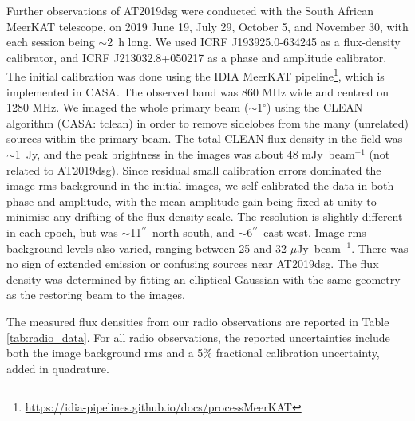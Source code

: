 \documentclass{nature_plusfigure}
\newcommand{\arcdeg}{\mbox{$^\circ$}}
\newcommand{\arcsec}{$^{\prime\prime}$}
\begin{document}
\begin{methods}
Further observations of AT2019dsg were conducted with the South African MeerKAT telescope, on 2019 June 19, July 29, October  5, and November 30, with each session being $\sim$2~h long.  We used ICRF J193925.0-634245 as a flux-density calibrator, and ICRF J213032.8+050217 as a phase and amplitude calibrator.  The initial calibration was done using the IDIA MeerKAT pipeline\footnote{\url{https://idia-pipelines.github.io/docs/processMeerKAT}}, which is implemented in CASA\@.  The observed band was 860 MHz wide and centred on 1280 MHz. We imaged the whole primary beam ($\sim 1$\arcdeg) using the CLEAN algorithm (CASA: tclean) in order to remove sidelobes from the many (unrelated) sources within the primary beam.  The total CLEAN flux density in the field was $\sim$1~Jy, and the peak brightness in the images was about 48 mJy~beam$^{-1}$ (not related to AT2019dsg). Since residual small calibration errors dominated the image rms background in the initial images, we self-calibrated the data in both phase and amplitude, with the mean amplitude gain being fixed at unity to minimise any drifting of the flux-density scale. The resolution is slightly different in each epoch, but was $\sim$11\arcsec\ north-south, and $\sim$6\arcsec\ east-west.  Image rms background levels also varied, ranging between 25 and 32 $\mu$Jy~beam$^{-1}$.  There was no sign of extended emission or confusing sources near AT2019dsg. The flux density was determined by fitting an elliptical Gaussian with the same geometry as the restoring beam to the images.  

The measured flux densities from our radio observations are reported in Table \ref{tab:radio_data}. For all radio observations, the reported uncertainties include both the image background rms and a 5\% fractional calibration uncertainty, added in quadrature.


\end{methods}
\end{document}
